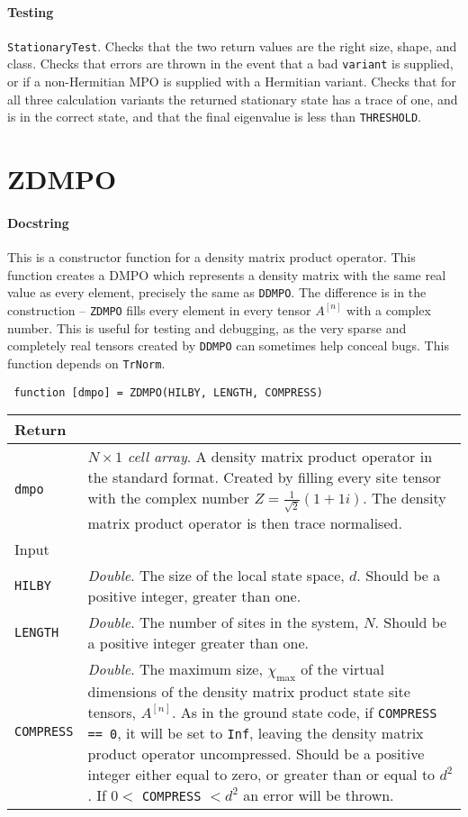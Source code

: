  \paragraph{Testing} \lstinline$StationaryTest$. Checks that the two return values are the right size, shape, and class. Checks that errors are thrown in the event that a bad \lstinline$variant$ is supplied, or if a non-Hermitian MPO is supplied with a Hermitian variant. Checks that for all three calculation variants the returned stationary state has a trace of one, and is in the correct state, and that the final eigenvalue is less than \lstinline$THRESHOLD$.

 \section{ZDMPO}
 \paragraph{Docstring} This is a constructor function for a density matrix product operator. This function creates a DMPO which represents a density matrix with the same real value as every element, precisely the same as \lstinline$DDMPO$. The difference is in the construction -- \lstinline$ZDMPO$ fills every element in every tensor \(A^{[n]}\) with a complex number. This is useful for testing and debugging, as the very sparse and completely real tensors created by \lstinline$DDMPO$ can sometimes help conceal bugs. This function depends on \lstinline$TrNorm$.
 \begin{lstlisting}
 function [dmpo] = ZDMPO(HILBY, LENGTH, COMPRESS) \end{lstlisting}
 \begin{longtabu}{X[1,l]X[4,l]}
 \hline
 Return & \\ \hline
 \lstinline$dmpo$ & \emph{\(N \times 1\) cell array}. A density matrix product operator in the standard format. Created by filling every site tensor with the complex number \(Z = \frac{1}{\sqrt{2}}(1 + 1i)\). The density matrix product operator is then trace normalised. \\ \hline
 Input & \\ \hline
 \lstinline$HILBY$ & \emph{Double}. The size of the local state space, \(d\). Should be a positive integer, greater than one.  \\
 \lstinline$LENGTH$ & \emph{Double}. The number of sites in the system, \(N\). Should be a positive integer greater than one. \\
 \lstinline$COMPRESS$ & \emph{Double}. The maximum size, \(\chi_{\mathrm{max}}\) of the virtual dimensions of the density matrix product state site tensors, \(A^{[n]}\). As in the ground state code, if \lstinline$COMPRESS == 0$, it will be set to \lstinline$Inf$, leaving the density matrix product operator uncompressed. Should be a positive integer either equal to zero, or greater than or equal to \(d^{2}\). If \(0 <\) \lstinline$COMPRESS$ \(< d^{2}\) an error will be thrown. \\
 \hline
 \end{longtabu}
